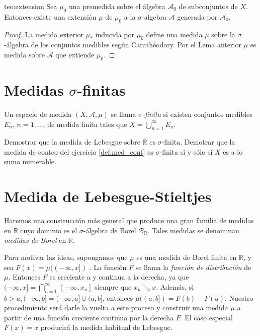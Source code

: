 
\begin{teorema}{teo:extension}
  Sea $\mu_0$ una premedida sobre el álgebra  $\mathscr{A}_0$ de subconjuntos de $X$. Entonces existe una extensión $\mu$ de $\mu_0$ a la $\sigma$-algebra   $\mathscr{A}$ generada por  $\mathscr{A}_0$.
\end{teorema}
\begin{proof}  La medida exterior $\mu_{*}$ inducida por $\mu_{0}$ define una medida $\mu$ sobre la $\sigma$-álgebra de los conjuntos medibles según  Carathéodory. Por el Lema anterior  $\mu$ es medida sobre $\mathscr{A}$ que extiende $\mu_{0}$. 

\end{proof}



\section{Medidas $\sigma$-finitas}

\begin{definicion}{} Un espacio de medida $(X,\mathcal{A},\mu)$ se llama \emph{$\sigma$-finita}  si existen conjuntos medibles $E_n$, $n=1,\ldots$, de medida finita tales que $X=\bigcup_{n=1}^{\infty}E_n$. 
 
\end{definicion}

\begin{ejercicio}{}
 Demostrar que la medida de Lebesgue sobre $\mathbb{R}$ es $\sigma$-finita. Demotrar que la medida de conteo del ejercicio \ref{def:med_cont}  es $\sigma$-finita si y sólo si $X$ es a lo sumo numerable.
\end{ejercicio}


\section{Medida de Lebesgue-Stieltjes}

Haremos una construcción más general  que produce una gran familia de medidas en $\mathbb{R}$ cuyo dominio es el $\sigma$-álgebra de Borel $\mathcal{B}_{\mathbb {R}}$. Tales medidas se denominan \emph{medidas de Borel} en $\mathbb{R}$.

Para motivar las ideas, supongamos que $\mu$ es una medida de Borel finita en $\mathbb{R}$, y sea $F(x)=\mu((-\infty, x])$ . La función $F$  se llama la \emph{función de distribución} de $\mu$.  Entonces $F$ es creciente a y continua a la derecha, ya que $(-\infty, x]=\bigcap\limits_{n=1}^{\infty}\left(-\infty, x_{n}\right]$ siempre que $x_{n} \searrow x$.  Además, si $b>a,(-\infty, b]=(-\infty, a] \cup(a, b]$, entonces $\mu((a, b])=F(b) -F(a)$. Nuestro procedimiento será darle la vuelta a este proceso y construir una medida $\mu$ a partir de una función creciente continua por la derecha $F$. El caso especial $F(x)=x$ producirá la medida habitual de Lebesgue.


